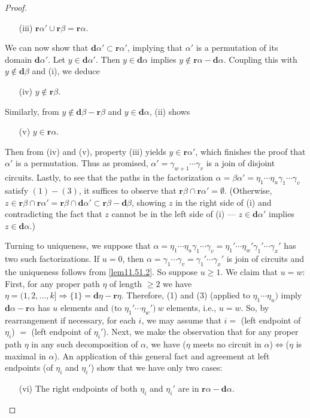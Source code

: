 \documentclass{surv-l}
\numberwithin{equation}{section}
\numberwithin{table}{section}
\numberwithin{figure}{section}
\theoremstyle{plain}
\theoremstyle{definition}
\begin{document}
\begin{proof}
\begin{enumerate}
\item[(iii)] $\mathbf{r}\alpha'\cup \mathbf{r}\beta=\mathbf{r}\alpha$.
\end{enumerate}
We can now show that $\mathbf{d}\alpha'\subset \mathbf{r}\alpha'$,
implying that $\alpha'$ is a permutation of its domain
$\mathbf{d}\alpha'$. Let $y\in \mathbf{d}\alpha'$. Then $ y\in
\mathbf{d}\alpha$ implies $y\not\in
\mathbf{r}\alpha-\mathbf{d}\alpha$. Coupling this with $ y\not\in
\mathbf{d}\beta$ and (i), we deduce
\begin{enumerate}
\item[(iv)] $y\not\in \mathbf{r}\beta$.
\end{enumerate}
Similarly, from $ y\not\in \mathbf{d}\beta-\mathbf{r}\beta$ and
$y\in \mathbf{d}\alpha$, (ii) shows
\begin{enumerate}
\item[(v)] $y\in \mathbf{r}\alpha$.
\end{enumerate}
Then from (iv) and (v), property (iii) yields $y\in
\mathbf{r}\alpha'$, which finishes the proof that $\alpha'$ is a
permutation. Thus as promised,
$\alpha'=\gamma_{w+1}\cdots\gamma_{v}$ is a join of disjoint
circuits. Lastly, to see that the paths in the factorization
$\alpha=\beta\alpha'=\eta_{1}\cdots\eta_{u}\gamma_{1}\cdots\gamma_{v}$
satisfy $(1)-(3)$, it suffices to observe that
$\mathbf{r}\beta\cap \mathbf{r}\alpha'=\emptyset$. (Otherwise, $z
\in \mathbf{r}\beta\cap \mathbf{r}\alpha'=\mathbf{r}\beta\cap
\mathbf{d}\alpha'\subset \mathbf{r}\beta-\mathbf{d}\beta$, showing
$z$ in the right side of (i) and contradicting the fact that $z$
cannot be in the left side of (i) --- $z \in \mathbf{d}\alpha'$
implies $z\in \mathbf{d}\alpha.$)

Turning to uniqueness, we suppose that
$\alpha=\eta_{1}\cdots\eta_{u}\gamma_{1}\cdots\gamma_{v}=\eta_{1}'\cdots
\eta_{w}'\gamma_{1}'\cdots \gamma_{x}'$ has two such
factorizations. If $u=0$, then $\alpha=\gamma_{1}\cdots\gamma_{v}=
\gamma_{1}'\cdots\gamma_{x}'$ is join of circuits and the
uniqueness follows from \ref{lem11.51.2}. So suppose $u\geq 1$. We
claim that $u=w$: First, for any proper path $\eta$ of length
$\geq 2$ we have $\eta=(1,2,\ldots, k]\Rightarrow\{1\}
=\mathbf{d}\eta-\mathbf{r}\eta$. Therefore, (1) and (3) (applied
to $\eta_{1}\cdots\eta_{u})$ imply
$\mathbf{d}\alpha-\mathbf{r}\alpha$ has $u$ elements and $($to
$\eta_{1}'\cdots\eta_{w}')\ w$ elements, i.e., $u=w$. So, by
rearrangement if necessary, for each $i$, we may assume that $i=$
(left endpoint of $\eta_{i}$) $=$ (left endpoint of $\eta_{i}'$).
Next, we make the observation that for any proper path $\eta$ in
any such decomposition of $\alpha$, we have ($\eta$ meets no
circuit in $\alpha$)\quad $\Leftrightarrow$\quad ($\eta$ is maximal in
$\alpha$). An application of this general fact and agreement at
left endpoints (of $\eta_{i}$ and $\eta_{i}'$) show that we have
only two cases:
\begin{enumerate}
\item[(vi)] The right endpoints of both $\eta_{i}$ and $\eta_{i}'$ are in
$\mathbf{r}\alpha-\mathbf{d}\alpha$.


\end{enumerate}
\end{proof}
\end{document}
